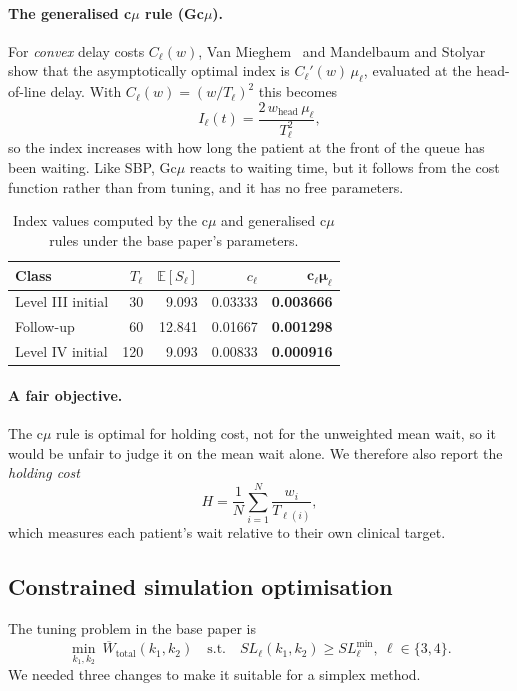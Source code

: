 \documentclass[sigconf,nonacm]{acmart}
\newcommand{\best}[1]{\textbf{#1}}
\begin{document}
\paragraph{The generalised c$\mu$ rule (Gc$\mu$).}
For \emph{convex} delay costs $C_\ell(w)$, Van Mieghem~\cite{vanmieghem1995gcmu}
and Mandelbaum and Stolyar~\cite{mandelbaum2004convex} show that the
asymptotically optimal index is $C_\ell'(w)\,\mu_\ell$, evaluated at the
head-of-line delay. With $C_\ell(w)=(w/T_\ell)^2$ this becomes
\begin{equation}
I_\ell(t) = \frac{2\,w_{\text{head}}\,\mu_\ell}{T_\ell^{2}} ,
\label{eq:gcmu}
\end{equation}
so the index increases with how long the patient at the front of the queue has
been waiting. Like SBP, Gc$\mu$ reacts to waiting time, but it follows from the
cost function rather than from tuning, and it has no free parameters.

\begin{table}[t]
\caption{Index values computed by the c$\mu$ and generalised c$\mu$ rules under
         the base paper's parameters.}
\label{tab:cmu}
\small
\begin{tabular}{@{}lrrrr@{}}
\toprule
\textbf{Class} & $T_\ell$ & $\mathbb{E}[S_\ell]$ & $c_\ell$ & $\mathbf{c_\ell\mu_\ell}$ \\
\midrule
Level III initial & 30  & 9.093  & 0.03333 & \best{0.003666} \\
Follow-up         & 60  & 12.841 & 0.01667 & \best{0.001298} \\
Level IV initial  & 120 & 9.093  & 0.00833 & \best{0.000916} \\
\bottomrule
\end{tabular}
\end{table}

\paragraph{A fair objective.}
The c$\mu$ rule is optimal for holding cost, not for the unweighted mean wait,
so it would be unfair to judge it on the mean wait alone. We therefore also
report the \emph{holding cost}
\begin{equation}
H = \frac{1}{N}\sum_{i=1}^{N} \frac{w_i}{T_{\ell(i)}} ,
\label{eq:holding}
\end{equation}
which measures each patient's wait relative to their own clinical target.

\subsection{Constrained simulation optimisation}
\label{sec:opt}
The tuning problem in the base paper is
\begin{equation}
\min_{k_1,k_2}\ \overline{W}_{\text{total}}(k_1,k_2)
\quad \text{s.t.} \quad SL_\ell(k_1,k_2) \ge SL^{\min}_\ell,\ \ell\in\{3,4\}.
\label{eq:problem}
\end{equation}
We needed three changes to make it suitable for a simplex method.
\end{document}
